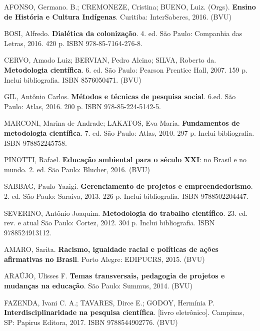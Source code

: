 \begin{pud}
	

	\begin{bibbasica}
			
        \item AFONSO, Germano. B.; CREMONEZE, Cristina; BUENO, Luiz. (Orgs). \textbf{Ensino de História e Cultura Indígenas}. Curitiba: InterSaberes, 2016. (BVU)
		\item BOSI, Alfredo. \textbf{Dialética da colonização}. 4. ed. São Paulo: Companhia das Letras, 2016. 420 p. ISBN 978-85-7164-276-8. %
		\item CERVO, Amado Luiz; BERVIAN, Pedro Alcino; SILVA, Roberto da. \textbf{Metodologia científica}. 6. ed. São Paulo: Pearson Prentice Hall, 2007. 159 p. Inclui bibliografia. ISBN 8576050471. (BVU) %
		\item GIL, Antônio Carlos. \textbf{Métodos e técnicas de pesquisa social}. 6.ed.  São Paulo: Atlas, 2016. 200 p. ISBN 978-85-224-5142-5. %
		\item MARCONI, Marina de Andrade; LAKATOS, Eva Maria. \textbf{Fundamentos de metodologia científica}. 7. ed. São Paulo: Atlas, 2010. 297 p. Inclui bibliografia. ISBN 978852245758. %
		\item PINOTTI, Rafael. \textbf{Educação ambiental para o século XXI}: no Brasil e no mundo. 2. ed. São Paulo: Blucher, 2016. (BVU)
		\item SABBAG, Paulo Yazigi. {\bfseries Gerenciamento de projetos e empreendedorismo}. 2. ed. São Paulo: Saraiva, 2013. 226 p. Inclui bibliografia. ISBN 9788502204447. %
		\item SEVERINO, Antônio Joaquim. {\bfseries Metodologia do trabalho científico}. 23. ed. rev. e atual São Paulo: Cortez, 2012. 304 p. Inclui bibliografia. ISBN 9788524913112. %
	 
	\end{bibbasica}
	
	\begin{bibcomplementar}
        	\item AMARO, Sarita. \textbf{Racismo, igualdade racial e políticas de ações afirmativas no Brasil}.  Porto Alegre: EDIPUCRS, 2015. (BVU)
		
 			\item ARAÚJO, Ulisses F.  {\bfseries Temas transversais, pedagogia de projetos e mudanças na educação}.  São Paulo: Summus, 2014. (BVU)
 			\item FAZENDA, Ivani C. A.; TAVARES, Dirce E.; GODOY, Hermínia P. \textbf{Interdisciplinaridade na pesquisa científica}. [livro eletrônico].  Campinas, SP: Papirus Editora, 2017.  ISBN 9788544902776. (BVU)
		

\end{bibcomplementar}
\end{pud}
